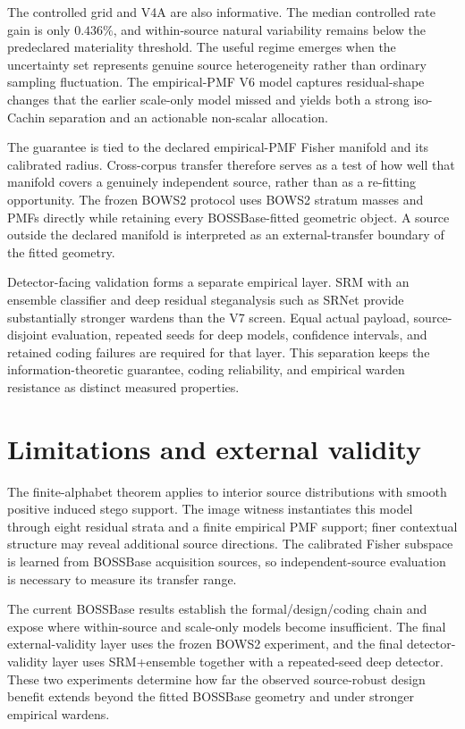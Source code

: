 \documentclass[10pt]{article}
\begin{document}
The controlled grid and V4A are also informative. The median controlled rate gain is only \(0.436\%\), and within-source natural variability remains below the predeclared materiality threshold. The useful regime emerges when the uncertainty set represents genuine source heterogeneity rather than ordinary sampling fluctuation. The empirical-PMF V6 model captures residual-shape changes that the earlier scale-only model missed and yields both a strong iso-Cachin separation and an actionable non-scalar allocation.

The guarantee is tied to the declared empirical-PMF Fisher manifold and its calibrated radius. Cross-corpus transfer therefore serves as a test of how well that manifold covers a genuinely independent source, rather than as a re-fitting opportunity. The frozen BOWS2 protocol uses BOWS2 stratum masses and PMFs directly while retaining every BOSSBase-fitted geometric object. A source outside the declared manifold is interpreted as an external-transfer boundary of the fitted geometry.

Detector-facing validation forms a separate empirical layer. SRM with an ensemble classifier \cite{fridrich2012} and deep residual steganalysis such as SRNet \cite{boroumand2019} provide substantially stronger wardens than the V7 screen. Equal actual payload, source-disjoint evaluation, repeated seeds for deep models, confidence intervals, and retained coding failures are required for that layer. This separation keeps the information-theoretic guarantee, coding reliability, and empirical warden resistance as distinct measured properties.

\section{Limitations and external validity}
The finite-alphabet theorem applies to interior source distributions with smooth positive induced stego support. The image witness instantiates this model through eight residual strata and a finite empirical PMF support; finer contextual structure may reveal additional source directions. The calibrated Fisher subspace is learned from BOSSBase acquisition sources, so independent-source evaluation is necessary to measure its transfer range.

The current BOSSBase results establish the formal/design/coding chain and expose where within-source and scale-only models become insufficient. The final external-validity layer uses the frozen BOWS2 experiment, and the final detector-validity layer uses SRM+ensemble together with a repeated-seed deep detector. These two experiments determine how far the observed source-robust design benefit extends beyond the fitted BOSSBase geometry and under stronger empirical wardens.
\end{document}
